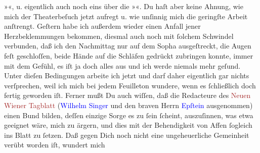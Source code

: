                   »\label{K_L01282_3v}\label{K_L01282_3h}«, u.
               eigentlich auch noch eins über die »\label{K_L01282_4v}\label{K_L01282_4h}«. Du haſt aber
               keine Ahnung, wie mich der Theaterbeſuch jetzt aufregt u. wie unſinnig mich die
               geringſte Arbeit {\pb}anſtrengt. Geſtern habe ich
               außerdem wieder einen Anfall jener Herzbeklemmungen bekommen, diesmal auch noch mit
               ſolchem Schwindel verbunden, daß ich den Nachmittag nur auf dem Sopha ausgeſtreckt,
               die Augen feſt geschloſſen, beide Hände auf die Schläfen gedrückt zubringen konnte,
               immer mit dem Gefühl, es iſt ja doch alles aus und ich werde niemals mehr geſund.
               Unter dieſen Bedingungen arbeite ich jetzt und darf daher eigentlich gar nichts
               verſprechen, weil ich mich bei jedem Feuilleton wundere, wenn es ſchließlich doch
               fertig geworden iſt.\pend
           \pstart
           Ferner mußt Du auch wiſſen, daß die Redacteure des {\pb}\textcolor{brown}{Neuen Wiener Tagblatt}{}\ledrightnote{\textcolor{brown}{Neues Wiener Tagblatt}} (\textcolor{blue}{Wilhelm Singer}{}\ledrightnote{\textcolor{blue}{Wilhelm Singer}} und den braven Herrn \textcolor{blue}{Epſtein}{}\ledrightnote{\textcolor{blue}{Moritz Epstein}} ausgenommen) einen Bund bilden, deſſen
               einzige Sorge es zu ſein ſcheint, auszuſinnen, was etwa geeignet wäre, mich zu
               ärgern, und dies mit der Behendigkeit von Affen ſogleich ins Blatt zu ſetzen. Daß
               gegen Dich noch nicht eine ungeheuerliche Gemeinheit verübt worden iſt, wundert mich
